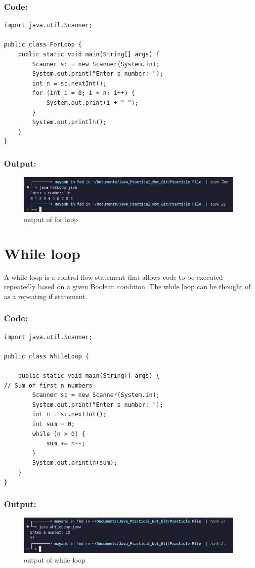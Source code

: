 \documentclass[a4paper,12pt]{article}
\begin{document}
\subsubsection{Code: }
\begin{lstlisting}
import java.util.Scanner;

public class ForLoop {
    public static void main(String[] args) {
        Scanner sc = new Scanner(System.in);
        System.out.print("Enter a number: ");
        int n = sc.nextInt();
        for (int i = 0; i < n; i++) {
            System.out.print(i + " ");
        }
        System.out.println();
    }
}
\end{lstlisting}
\subsubsection{Output: }
\begin{figure}[H]
    \centering
    \includegraphics[width=0.9\linewidth]{images/ForOut.png}
    \caption{output of for loop}
    \label{fig:sample_image}
\end{figure}

\section{While loop}
A while loop is a control flow statement that allows code to be executed repeatedly
based on a given Boolean condition. The while loop can be thought of as a repeating if
statement.
\subsubsection{Code: }
\begin{lstlisting}
import java.util.Scanner;

public class WhileLoop {

    public static void main(String[] args) {
// Sum of first n numbers
        Scanner sc = new Scanner(System.in);
        System.out.print("Enter a number: ");
        int n = sc.nextInt();
        int sum = 0;
        while (n > 0) {
            sum += n--;
        }
        System.out.println(sum);
    }
}
\end{lstlisting}
\subsubsection{Output: }
\begin{figure}[H]
    \centering
    \includegraphics[width=0.9\linewidth]{images/WhileOut.png}
    \caption{output of while loop}
    \label{fig:sample_image}
\end{figure}
\end{document}
